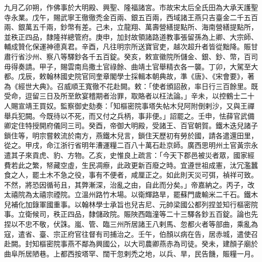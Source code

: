 \begin{pinyinscope}
 九月乙卯朔，作佛事於大明殿、興聖、隆福諸宮。市故宋太后全氏田為大承天護聖寺永業。戊午，賜武寧王徹徹禿金百兩、銀五百兩，西域諸王燕只吉臺金二千五百兩、銀萬五千兩，鈔幣有差。己未，立龍翔、萬壽營繕提點所、海南營繕提點所，並秩正四品，隸隆祥總管府。庚申，加封故領諸路道教事張留孫為上卿、大宗師、輔成贊化保運神德真君。辛酉，凡往明宗所送寶官吏，越次超升者皆從黜降。賑甘肅行省沙州、察八等驛鈔各千五百錠。癸亥，敕宣徽院所儲金、銀、鈔、幣，百司毋得奏請。甲子，賜雲南烏撒土官祿餘、曲靖土官舉精衣各一襲。丁卯，大駕至大都。戊辰，敕翰林國史院官同奎章閣學士採輯本朝典故，準《唐》、《宋會要》，著為《經世大典》。召威順王寬徹不花赴闕。敕：「使者頒詔赦，率日行三百餘里。既受命，逗留三日及所至飲宴稽期者治罪，取賂者以枉法論。」辛未，以控鶴士二十人賜宣靖王買奴。監察御史劾奏：「知樞密院事塔失帖木兒阿附倒剌沙，又與王禪舉兵犯闕。今既待以不死，而又付之兵柄，事非便。」詔罷之。壬申，怯薛官武備卿定住特授開府儀同三司。癸酉，帝御大明殿，受諸王、百官朝賀。鐵木迭兒諸子鎖住等，明宗嘗敕流於南方，燕鐵木兒言，鎖住天歷初有勞於國，請各遣還田里，從之。甲戌，命江浙行省明年漕運糧二百八十萬石赴京師。廣西思明州土官黃宗永遣其子來貢虎、豹、方物。乙亥，史惟良上疏言：「今天下郡邑被災者眾，國家經費若此之繁，帑藏空虛，生民凋瘵，此政更新百廢之時。宜遵世祖成憲，汰冗濫蠶食之人，罷土木不急之役，事有不便者，咸厘正之。如此則天災可弭，禎祥可致。不然，將恐因循茍且，其弊漸深，治亂之由，自此而分矣。」帝嘉納之。丙子，改太禧院為太禧宗禋院。立溫州路竹木場。以衛輝路旱，罷蘇門歲輸米二千石。鐵木兒補化加錄軍國重事。以翰林學士承旨也兒吉尼、元帥梁國公都列捏並知行樞密院事。立衛候司，秩正四品，隸儲政院。賑陜西臨潼等二十三驛各鈔五百錠。論也先捏以不忠不敬，伏誅。嵐、管、臨三州所居諸王八剌馬、忽都火者等部曲，乘亂為寇，遣省、臺、宗正府官往督有司捕治之。壬午，伯顏以病在告，居赤城，遣使召赴闕。封知樞密院事燕不鄰為興國公，以大司農卿燕赤為司徒。癸未，建顏子廟於曲阜所居陋巷。上都西按塔罕、闊干忽剌禿之地，以兵、旱，民告饑，賑糧一月。




\end{pinyinscope}
